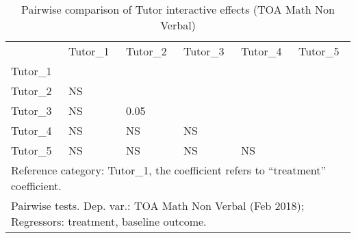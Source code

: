 \begin{table}[htbp]
  \centering
  \renewcommand{\arraystretch}{1.1}
  \caption{Pairwise comparison of Tutor interactive effects (TOA Math Non Verbal)}
\begin{tabular}{p{3cm}p{2.3cm}p{2.3cm}p{2.3cm}p{2.3cm}p{2.3cm}}
    \midrule
          & Tutor\_1 & Tutor\_2 & Tutor\_3 & Tutor\_4 & Tutor\_5 \\
    Tutor\_1 & \cellcolor{black}  &       &       &       &  \\
    Tutor\_2 & NS    & \cellcolor{black}  &       &       &  \\
    Tutor\_3 & NS   & 0.05    & \cellcolor{black}  &       &  \\
    Tutor\_4 & NS    & NS & NS    & \cellcolor{black}  &  \\
    Tutor\_5 & NS    & NS    & NS    & NS    & \cellcolor{black}  \\
    \midrule
    \multicolumn{6}{l}{\footnotesize Reference category: Tutor\_1, the coefficient refers to \enquote{treatment} coefficient.} \\
    \multicolumn{6}{l}{\footnotesize Pairwise tests. Dep. var.: TOA Math Non Verbal (Feb 2018); Regressors: treatment, baseline outcome.} \\
    \end{tabular}%
  \label{tab:tutormatrix}%
\end{table}%
